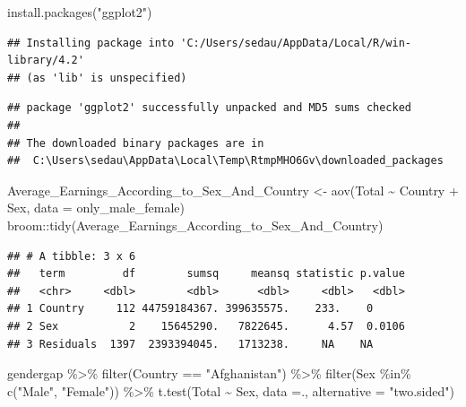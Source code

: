 \documentclass[
]{article}
\newenvironment{Shaded}{\begin{snugshade}}{\end{snugshade}}
\newcommand{\AttributeTok}[1]{\textcolor[rgb]{0.77,0.63,0.00}{#1}}
\newcommand{\FunctionTok}[1]{\textcolor[rgb]{0.00,0.00,0.00}{#1}}
\newcommand{\NormalTok}[1]{#1}
\newcommand{\OtherTok}[1]{\textcolor[rgb]{0.56,0.35,0.01}{#1}}
\newcommand{\SpecialCharTok}[1]{\textcolor[rgb]{0.00,0.00,0.00}{#1}}
\newcommand{\StringTok}[1]{\textcolor[rgb]{0.31,0.60,0.02}{#1}}
\begin{document}
\begin{Shaded}
\begin{Highlighting}[]
  \FunctionTok{install.packages}\NormalTok{(}\StringTok{"ggplot2"}\NormalTok{)}
\end{Highlighting}
\end{Shaded}

\begin{verbatim}
## Installing package into 'C:/Users/sedau/AppData/Local/R/win-library/4.2'
## (as 'lib' is unspecified)
\end{verbatim}

\begin{verbatim}
## package 'ggplot2' successfully unpacked and MD5 sums checked
## 
## The downloaded binary packages are in
##  C:\Users\sedau\AppData\Local\Temp\RtmpMHO6Gv\downloaded_packages
\end{verbatim}

\begin{Shaded}
\begin{Highlighting}[]
\NormalTok{Average\_Earnings\_According\_to\_Sex\_And\_Country }\OtherTok{\textless{}{-}} \FunctionTok{aov}\NormalTok{(Total }\SpecialCharTok{\textasciitilde{}}\NormalTok{ Country }\SpecialCharTok{+}\NormalTok{ Sex, }\AttributeTok{data =}\NormalTok{ only\_male\_female)}
\NormalTok{broom}\SpecialCharTok{::}\FunctionTok{tidy}\NormalTok{(Average\_Earnings\_According\_to\_Sex\_And\_Country)  }
\end{Highlighting}
\end{Shaded}

\begin{verbatim}
## # A tibble: 3 x 6
##   term         df        sumsq     meansq statistic p.value
##   <chr>     <dbl>        <dbl>      <dbl>     <dbl>   <dbl>
## 1 Country     112 44759184367. 399635575.    233.    0     
## 2 Sex           2    15645290.   7822645.      4.57  0.0106
## 3 Residuals  1397  2393394045.   1713238.     NA    NA
\end{verbatim}

\begin{Shaded}
\begin{Highlighting}[]
\NormalTok{gendergap }\SpecialCharTok{\%\textgreater{}\%}
  \FunctionTok{filter}\NormalTok{(Country }\SpecialCharTok{==} \StringTok{"Afghanistan"}\NormalTok{) }\SpecialCharTok{\%\textgreater{}\%}
\FunctionTok{filter}\NormalTok{(Sex }\SpecialCharTok{\%in\%} \FunctionTok{c}\NormalTok{(}\StringTok{"Male"}\NormalTok{, }\StringTok{"Female"}\NormalTok{)) }\SpecialCharTok{\%\textgreater{}\%}
  \FunctionTok{t.test}\NormalTok{(Total }\SpecialCharTok{\textasciitilde{}}\NormalTok{ Sex, }\AttributeTok{data =}\NormalTok{., }\AttributeTok{alternative =} \StringTok{"two.sided"}\NormalTok{)}
\end{Highlighting}
\end{Shaded}
\end{document}
